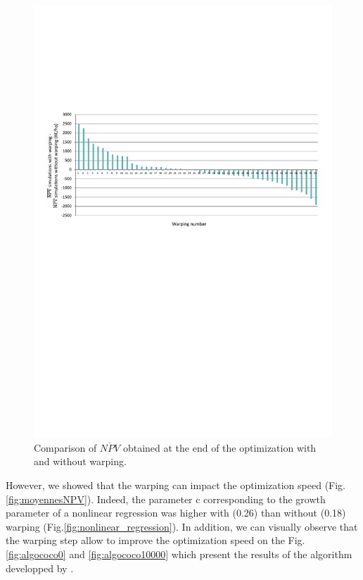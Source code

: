 \begin{figure}[!ht]
	\centering
	\includegraphics[trim = 0cm 11cm 0cm 6cm, clip]{Figures_Warping_resultats_warping_moins_sanswarping.pdf}
	\caption{Comparison of $\overline{NPV}$ obtained at the end of the optimization with and without warping. }\label{fig:waping_moins_sanswarping}
\end{figure}

However, we showed that the warping can impact the optimization speed (Fig.\ref{fig:moyennesNPV}). 
Indeed, the parameter c corresponding to the growth parameter of a nonlinear regression was higher with (0.26) than without (0.18) warping (Fig.\ref{fig:nonlinear_regression}). 
In addition, we can visually observe that the warping step allow to improve the optimization speed on the Fig.\ref{fig:algococo0} and \ref{fig:algococo10000} 
which present the results of the algorithm developped by .

